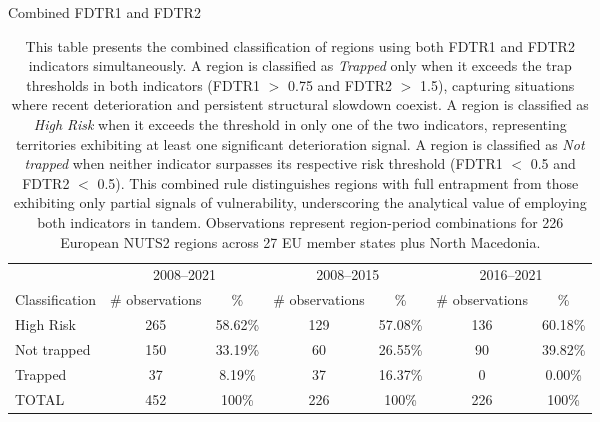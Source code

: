 \documentclass[a4paper,11pt,oneside]{article}
\begin{document}
\begin{table}%
\centering
\caption{Combined FDTR1 and FDTR2}
\vspace{-2mm}
\caption*{\footnotesize This table presents the combined classification of regions using both FDTR1 and FDTR2 indicators simultaneously. A region is classified as \textit{Trapped} only when it exceeds the trap thresholds in both indicators (FDTR1 $>$ 0.75 and FDTR2 $>$ 1.5), capturing situations where recent deterioration and persistent structural slowdown coexist. A region is classified as \textit{High Risk} when it exceeds the threshold in only one of the two indicators, representing territories exhibiting at least one significant deterioration signal. A region is classified as \textit{Not trapped} when neither indicator surpasses its respective risk threshold (FDTR1 $<$ 0.5 and FDTR2 $<$ 0.5). This combined rule distinguishes regions with full entrapment from those exhibiting only partial signals of vulnerability, underscoring the analytical value of employing both indicators in tandem. Observations represent region-period combinations for 226 European NUTS2 regions across 27 EU member states plus North Macedonia.}
\label{tbl:combined_fdtr1_fdtr2}
\footnotesize
\begin{tabular}{lcccccc}
\toprule
               & \multicolumn{2}{c}{2008--2021} & \multicolumn{2}{c}{2008--2015}    & \multicolumn{2}{c}{2016--2021}    \\
\cmidrule(r){2-3}
\cmidrule(r){4-5}
\cmidrule(r){6-7}
Classification & \# observations    & \%         & \# observations & \%      & \# observations & \%      \\
\midrule
High Risk      & 265                       & 58.62\%    & 129                    & 57.08\% & 136                    & 60.18\% \\
Not trapped    & 150                       & 33.19\%    & 60                     & 26.55\% & 90                     & 39.82\% \\
Trapped        & 37                        & 8.19\%     & 37                     & 16.37\% & 0                      & 0.00\%  \\
\midrule
TOTAL          & 452                       & 100\%      & 226                    & 100\%   & 226                    & 100\%   \\
\bottomrule
\end{tabular}
\end{table}



\pagebreak
\clearpage
\end{document}
